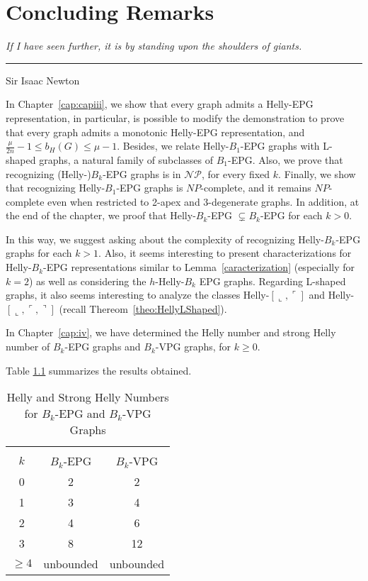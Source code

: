 \chapter{Concluding Remarks}\label{conclusao}

\begin{flushright}
\begin{minipage}[t][0cm][b]{0.47\textwidth}
\emph{
If I have seen further, it is by standing upon the shoulders of giants.}
\end{minipage}

\rule[0cm]{7cm}{0.03cm}%

Sir Isaac Newton
\end{flushright}


In Chapter~\ref{cap:capiii}, we show that every graph admits a Helly-EPG representation, in particular, is possible to modify the demonstration to prove that every graph admits a monotonic Helly-EPG representation, and $\frac{\mu}{2n}-1\leq b_H(G)\leq \mu -1$. Besides, we relate Helly-$B_1$-EPG graphs with L-shaped graphs, a natural family of subclasses of $B_1$-EPG. Also, we prove that recognizing (Helly-)$B_k$-EPG graphs is in $\mathcal{NP}$, for every fixed $k$. Finally, we show that recognizing Helly-$B_1$-EPG graphs is $NP$-complete, and it remains $NP$-complete even when restricted to 2-apex and 3-degenerate graphs. In addition, at the end of the chapter, we proof that
Helly-$B_k$-EPG $\subsetneq B_k$-EPG for each $k>0$.

In this way, we suggest asking about the complexity of recognizing Helly-$B_k$-EPG graphs for each $k>1$. Also, it seems interesting to present characterizations for Helly-$B_k$-EPG representations similar to Lemma~\ref{caracterization} (especially for $k=2$) as well as considering the $h$-Helly-$B_k$ EPG graphs. Regarding L-shaped graphs, it also seems interesting to analyze the classes Helly-$[\llcorner, \ulcorner]$ and Helly-$[\llcorner, \ulcorner, \urcorner]$ (recall Thereom~\ref{theo:HellyLShaped}).

In Chapter~\ref{cap:iv}, we have determined the Helly number and strong Helly number of $B_k$-EPG graphs and $B_k$-VPG graphs, for $k \geq 0$. 

Table \ref{tab:Helly-Strong-Helly2} summarizes the results obtained.
 
\Large 

\begin{table}[htb]
    \centering
    \caption{Helly and Strong Helly Numbers for $B_k$-EPG and $B_k$-VPG Graphs}
    \label{tab:Helly-Strong-Helly2}
    \begin{tabular}{c|c|c}
     \multicolumn{3}{c}{}\\
    \cline{1-3} $k$  & $B_k$-EPG & $B_k$-VPG \\
    \cline{1-3} 0 & 2 & 2 \\
    \cline{1-3} 1 & 3 & 4 \\
    \cline{1-3} 2 & 4 & 6 \\
    \cline{1-3} 3 & 8 & 12 \\
    \cline{1-3} $\geq 4$ & unbounded & unbounded \\
    \cline{1-3} 
    \end{tabular}
\end{table}

